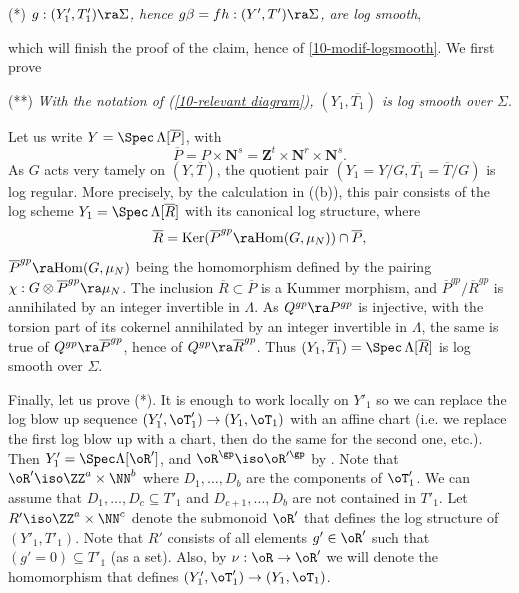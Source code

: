 \documentclass[10pt]{../fichiers-configuration-latex/smfart}
\begin{document}
\medskip (*) \textit{$g : (Y'_1,T'_1) \ra \Sigma$, hence $g\beta = fh :
(Y',T') \ra \Sigma$, are log smooth},

\medskip \noindent which will finish the proof of the claim, hence of
\ref{10-modif-logsmooth}. We first prove

\medskip (**) \textit{With the notation of (\ref{10-relevant diagram}),
$(Y_1,\overline{T_1})$ is log smooth over $\Sigma$}.

\medskip Let us write $Y = \Spec \, \Lambda[\overline{P}]$, with
\begin{equation}\label{10-Peq} \overline{P} = P \times \mathbf{N}^s =
\mathbf{Z}^t \times \mathbf{N}^r \times \mathbf{N}^s.
\end{equation} As
$G$ acts very tamely on $(Y,\overline{T})$, the quotient pair $(Y_1 = Y/G,
\overline{T_1} = \overline{T}/G)$ is log regular. More precisely, by the
calculation in ((b)), this pair consists of the log scheme $Y_1 =
\Spec \, \Lambda[\overline{R}]$ with its canonical log structure, where $$
\overline{R} = \mathrm{Ker}(\overline{P}^{gp} \ra \mathrm{Hom}(G,\mu_N))
\cap \overline{P}, $$ $\overline{P}^{gp} \ra \mathrm{Hom}(G,\mu_N)$ being
the homomorphism defined by the pairing $\chi : G \otimes \overline{P}^{gp}
\ra \mu_N$. The inclusion $\overline{R} \subset \overline{P}$ is a Kummer
morphism, and $\overline{P}^{gp}/\overline{R}^{gp}$ is annihilated by
an integer invertible in $\Lambda$. As $Q^{gp} \ra P^{gp}$ is injective,
with the torsion part of its cokernel annihilated by an integer invertible
in $\Lambda$, the same is true of $Q^{gp} \ra \overline{P}^{gp}$, hence
of $Q^{gp} \ra \overline{R}^{gp}$. Thus $(Y_1,\overline{T_1}) = \Spec \,
\Lambda[\overline{R}]$ is log smooth over $\Sigma$.

Finally, let us prove (*). It is enough to work locally on $Y'_1$ so we
can replace the log blow up sequence $(Y'_1,\oT'_1)\to(Y_1,\oT_1)$ with
an affine chart (i.e. we replace the first log blow up with a chart, then
do the same for the second one, etc.). Then $Y'_1=\Spec\Lambda[\oR']$,
and $\oR^\gp\iso\oR'^\gp$ by . Note that
$\oR'\iso\ZZ^a\times\NN^b$ where $D_1,\dots,D_b$ are the components of $\oT'_1$.
We can assume that $D_1,\dots,D_c\subseteq T'_1$ and $D_{c+1},\dots,D_b$
are not contained in $T'_1$. Let $R'\iso\ZZ^a\times\NN^c$ denote the
submonoid $\oR'$ that defines the log structure of $(Y'_1,T'_1)$. Note that
$R'$ consists of all elements $g'\in\oR'$ such that $(g'=0)\subseteq T'_1$
(as a set). Also, by $\nu:\oR\to\oR'$ we will denote the homomorphism that
defines $(Y'_1,\oT'_1)\to(Y_1,\oT_1)$.
\end{document}
